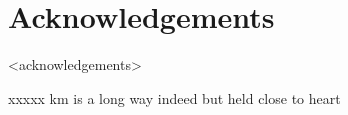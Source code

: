 %
%
\chapter*{Acknowledgements}

<acknowledgements>









%
%
%
    xxxxx km is a long way indeed
    but held close to heart

